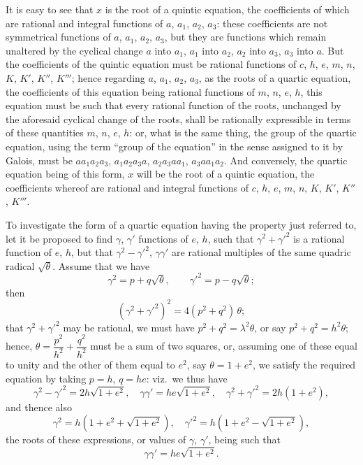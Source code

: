 \documentclass[11pt]{article}
\begin{document}
It is easy to see that $x$ is the root of a quintic equation, the coefficients of
which are rational and integral functions of $a$, $a_1$, $a_2$, $a_3$: these coefficients are not
symmetrical functions of $a$, $a_1$, $a_2$, $a_3$, but they are functions which remain unaltered
by the cyclical change $a$ into $a_1$, $a_1$ into $a_2$, $a_2$ into $a_3$, $a_3$ into $a$. But the coefficients
of the quintic equation must be rational functions of $c$, $h$, $e$, $m$, $n$, $K$, $K'$, $K''$, $K'''$;
hence regarding $a$, $a_1$, $a_2$, $a_3$, as the roots of a quartic equation, the coefficients of
this equation being rational functions of $m$, $n$, $e$, $h$, this equation must be such that
every rational function of the roots, unchanged by the aforesaid cyclical change of
the roots, shall be rationally expressible in terms of these quantities $m$, $n$, $e$, $h$: or,
what is the same thing, the group of the quartic equation, using the term ``group
of the equation'' in the sense assigned to it by Galois, must be $a a_1 a_2 a_3$, $a_1 a_2 a_3 a$,
$a_2 a_3 a a_1$, $a_3 a a_1 a_2$. And conversely, the quartic equation being of this form, $x$ will be
the root of a quintic equation, the coefficients whereof are rational and integral
functions of $c$, $h$, $e$, $m$, $n$, $K$, $K'$, $K''$, $K'''$.

To investigate the form of a quartic equation having the property just referred
to, let it be proposed to find $\gamma$, $\gamma'$ functions of $e$, $h$, such that $\gamma^2 + \gamma'^2$ is a rational
function of $e$, $h$, but that $\gamma^2 - \gamma'^2$, $\gamma\gamma'$ are rational multiples of the same quadric radical
$\sqrt{\theta}$. Assume that we have
\[
   \gamma^2 = p + q\sqrt{\theta},\qquad \gamma'^2 = p - q\sqrt{\theta};
\]
then
\[
   (\gamma^2 + \gamma'^2)^2 = 4(p^2 + q^2)\,\theta;
\]
that $\gamma^2 + \gamma'^2$ may be rational, we must have $p^2 + q^2 = \lambda^2 \theta$, or say $p^2 + q^2 = h^2 \theta$; hence,
$\theta = \dfrac{p^2}{h^2} + \dfrac{q^2}{h^2}$ must be a sum of two squares, or, assuming one of these equal to unity
and the other of them equal to $e^2$, say $\theta = 1 + e^2$, we satisfy the required equation by
taking $p = h$, $q = he$: viz.\ we thus have
\[
   \gamma^2 - \gamma'^2 = 2h\sqrt{1 + e^2},\quad \gamma\gamma' = he\sqrt{1 + e^2},\quad \gamma^2 + \gamma'^2 = 2h(1 + e^2),
\]
and thence also
\[
   \gamma^2 = h(1 + e^2 + \sqrt{1 + e^2}),\quad \gamma'^2 = h(1 + e^2 - \sqrt{1 + e^2}),
\]
the roots of these expressions, or values of $\gamma$, $\gamma'$, being such that
\[
   \gamma\gamma' = he\sqrt{1 + e^2}.
\]
\end{document}
